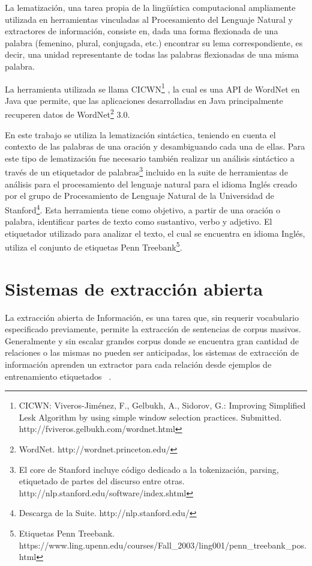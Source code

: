 La lematizaci\'on, una tarea propia de la lingü\'istica computacional ampliamente utilizada en herramientas vinculadas al Procesamiento del Lenguaje Natural y extractores de informaci\'on, consiste en, dada una forma flexionada de una palabra (femenino, plural, conjugada, etc.) encontrar su lema correspondiente, es decir, una unidad representante de todas las palabras flexionadas de una misma palabra.

La herramienta utilizada se llama CICWN\footnote{CICWN: Viveros-Jim\'enez, F., Gelbukh, A., Sidorov, G.: Improving Simplified Lesk Algorithm by using simple window selection practices. Submitted. http://fviveros.gelbukh.com/wordnet.html} , la cual es una API de WordNet en Java que permite, que las aplicaciones desarrolladas en Java principalmente recuperen datos de WordNet\footnote{WordNet. http://wordnet.princeton.edu/} 3.0.

En este trabajo se utiliza la lematizaci\'on sint\'actica, teniendo en cuenta el contexto de las palabras de una oraci\'on y desambiguando cada una de ellas.  Para este tipo de lematizaci\'on fue necesario tambi\'en realizar un an\'alisis sint\'actico a trav\'es de un etiquetador de palabras\footnote{El core de Stanford incluye c\'odigo dedicado a la  tokenizaci\'on, parsing, etiquetado de partes del discurso entre otras. http://nlp.stanford.edu/software/index.shtml}  incluido en la suite de herramientas de an\'alisis para el procesamiento del lenguaje natural para el idioma Ingl\'es creado por el grupo de Procesamiento de Lenguaje Natural de la Universidad de Stanford\footnote{Descarga de la Suite. http://nlp.stanford.edu/}. Esta herramienta tiene como objetivo, a partir de una oraci\'on o palabra, identificar partes de texto como sustantivo, verbo y adjetivo. El etiquetador utilizado para analizar el texto, el cual se encuentra en idioma Ingl\'es,  utiliza el conjunto de etiquetas Penn Treebank\footnote{Etiquetas Penn Treebank.\\ https://www.ling.upenn.edu/courses/Fall\_2003/ling001/penn\_treebank\_pos.html}.


\section{Sistemas de extracci\'on abierta}
La extracci\'on abierta de Informaci\'on, es una tarea que, sin requerir vocabulario especificado previamente, permite la extracci\'on de sentencias de corpus masivos.
Generalmente y sin escalar grandes corpus donde se encuentra gran cantidad de relaciones o las mismas no pueden ser anticipadas, los sistemas de extracci\'on de informaci\'on aprenden un extractor para cada relaci\'on desde ejemplos de entrenamiento etiquetados ~\cite{KimMol:93}.

